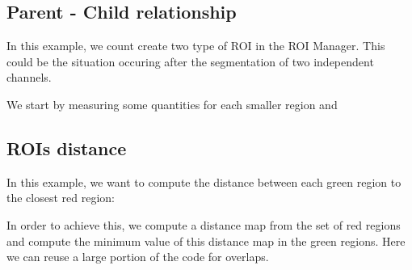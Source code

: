 { \subsection{Parent - Child relationship}

 In this example, we count create two type of ROI in the ROI Manager. This could
 be the situation occuring after the segmentation of two independent channels.

 \begin{figure}[h]
   \begin{center}
   \end{center}
 \end{figure}

We start by measuring some quantities for each smaller region and


 


 \subsection{ROIs distance}

 In this example, we want to compute the distance between each green
 region to the closest red region:

 \begin{figure}[h]
   \begin{center}
   \end{center}
 \end{figure}

 In order to achieve this, we compute a distance map from the set of
 red regions and compute the minimum value of this distance map in the
 green regions. Here we can reuse a large portion of the code for overlaps.

}
